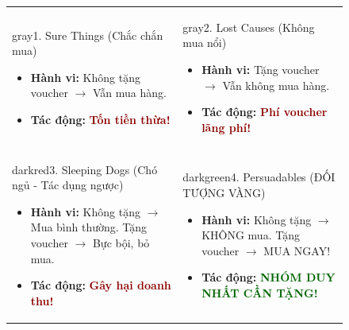 \documentclass[11pt,a4paper]{article}
\begin{document}
\vspace{0.5em}
\begin{figure}[H]
\centering
\begin{tabularx}{\textwidth}{XX}
\begin{quadrantbox}{gray}{1. Sure Things (Chắc chắn mua)}
\begin{itemize}
    \item \textbf{Hành vi:} Không tặng voucher $\rightarrow$ Vẫn mua hàng.
    \item \textbf{Tác động:} \textcolor{darkred}{\textbf{Tốn tiền thừa!}}
\end{itemize}
\end{quadrantbox}
&
\begin{quadrantbox}{gray}{2. Lost Causes (Không mua nổi)}
\begin{itemize}
    \item \textbf{Hành vi:} Tặng voucher $\rightarrow$ Vẫn không mua hàng.
    \item \textbf{Tác động:} \textcolor{darkred}{\textbf{Phí voucher lãng phí!}}
\end{itemize}
\end{quadrantbox}
\\
\begin{quadrantbox}{darkred}{3. Sleeping Dogs (Chó ngủ - Tác dụng ngược)}
\begin{itemize}
    \item \textbf{Hành vi:} Không tặng $\rightarrow$ Mua bình thường. Tặng voucher $\rightarrow$ Bực bội, bỏ mua.
    \item \textbf{Tác động:} \textcolor{darkred}{\textbf{Gây hại doanh thu!}}
\end{itemize}
\end{quadrantbox}
&
\begin{quadrantbox}{darkgreen}{4. Persuadables (ĐỐI TƯỢNG VÀNG)}
\begin{itemize}
    \item \textbf{Hành vi:} Không tặng $\rightarrow$ KHÔNG mua. Tặng voucher $\rightarrow$ MUA NGAY!
    \item \textbf{Tác động:} \textcolor{darkgreen}{\textbf{NHÓM DUY NHẤT CẦN TẶNG!}}
\end{itemize}
\end{quadrantbox}
\end{tabularx}
\end{figure}
\end{document}
